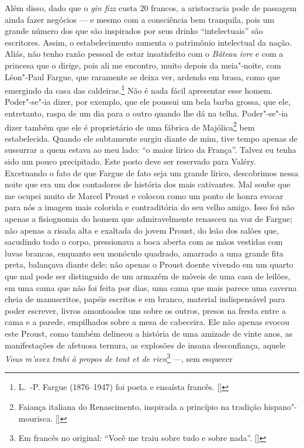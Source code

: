 Além disso, dado que o \emph{gin fizz} custa 20 francos, a aristocracia
pode de passagem ainda fazer negócios --- e mesmo com a consciência bem
tranquila, pois um grande número dos que são inspirados por seus
drinks ``intelectuais'' são escritores. Assim, o estabelecimento aumenta o patrimônio intelectual da nação. Aliás, não tenho razão pessoal de estar insatisfeito
com o \emph{Bâteau ivre} e com a princesa que o dirige, pois ali me
encontro, muito depois da meia"-noite, com Léon"-Paul Fargue, que raramente se deixa ver, ardendo em brasa, como que emergindo da casa das
caldeiras.\footnote{L.~-P. Fargue (1876--1947) foi poeta e
  ensaísta francês. []} Não é nada fácil apresentar esse homem.
Poder"-se"-ia dizer, por exemplo, que ele poussui um bela barba grossa,
que ele, entretanto, raspa de um dia para o outro quando lhe dá na
telha. Poder"-se"-ia dizer também que ele é proprietário de uma fábrica de
Majólica\footnote{Faiança italiana do Renascimento, inspirada a
  princípio na tradição hispano"-mourisca. []} bem estabelecida. Quando ele
subtamente surgiu diante de mim, tive tempo apenas de sussurrar a quem
estava ao meu lado: ``o maior lírico da França''. Talvez eu tenha sido
um pouco precipitado. Este posto deve ser reservado para Valéry.
Excetuando o fato de que Fargue de fato seja um grande lírico,
descobrimos nessa noite que era um dos contadores de história dos mais
cativantes. Mal soube que me ocupei muito de Marcel Proust e colocou
como um ponto de honra evocar para nós a imagem mais colorida e
contraditória do seu velho amigo. Isso foi não apenas a fisiognomia do
homem que admiravelmente renasceu na voz de Fargue; não apenas a risada
alta e exaltada do jovem Proust, do leão dos salões que, sacudindo todo
o corpo, pressionava a boca aberta com as mãos vestidas com luvas
brancas, enquanto seu monóculo quadrado, amarrado a uma grande fita
preta, balançava diante dele; não apenas o Proust doente vivendo em um
quarto que mal pode ser distinguido de um armazém de móveis de uma casa
de leilões, em uma cama que não foi feita por dias, uma cama que mais
parece uma caverna cheia de manuscritos, papéis escritos e em branco,
material indispensável para poder escrever, livros amontoados uns sobre
os outros, presos na fresta entre a cama e a parede, empilhados sobre a
mesa de cabeceira. Ele não apenas evocou este Proust, como também
delineou a história de uma amizade de vinte anos, as manifestações de
afetuosa ternura, as explosões de insana desconfiança, aquele \emph{Vous
m'avez trahi à propos de tout et de rien}\footnote{Em francês no original: ``Você me traiu sobre tudo e sobre nada''. []} ---, sem esquecer

